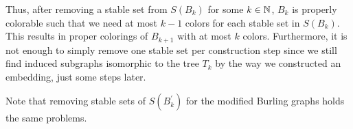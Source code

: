 Thus, after removing a stable set from $S(B_k)$ for some $k\in\mathbb{N}$, $B_k$ is properly colorable such that we need at most $k-1$ colors for each stable set in $S(B_k)$. This results in proper colorings of $B_{k+1}$ with at most $k$ colors. Furthermore, it is not enough to simply remove one stable set per construction step since we still find induced subgraphs isomorphic to the tree $T_k$ by the way we constructed an embedding, just some steps later.

Note that removing stable sets of $S(B_k^\prime )$ for the modified Burling graphs holds the same problems.